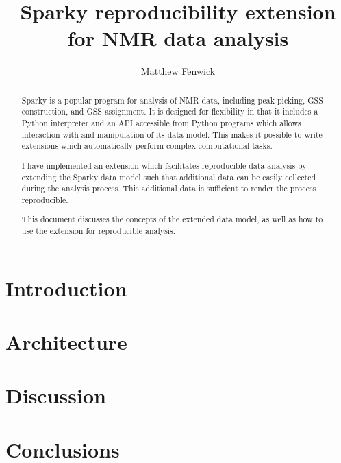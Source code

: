 \documentclass[11pt,a4paper]{article}
\begin{document}
\author{Matthew Fenwick}
\title{Sparky reproducibility extension for NMR data analysis}
\maketitle

\begin{abstract}
Sparky is a popular program for analysis of NMR data, including peak picking,
GSS construction, and GSS assignment.  It is designed for flexibility in that
it includes a Python interpreter and an API accessible from Python programs
which allows interaction with and manipulation of its data model.  This makes
it possible to write extensions which automatically perform complex
computational tasks.

I have implemented an extension which facilitates reproducible data analysis
by extending the Sparky data model such that additional data can be easily
collected during the analysis process.  This additional data is sufficient
to render the process reproducible.

This document discusses the concepts of the extended data model, as well as
how to use the extension for reproducible analysis.
\end{abstract}

\tableofcontents
\listoftables
\listoffigures


\section{Introduction}


\section{Architecture}


\section{Discussion}


\section{Conclusions}



%

\end{document}
